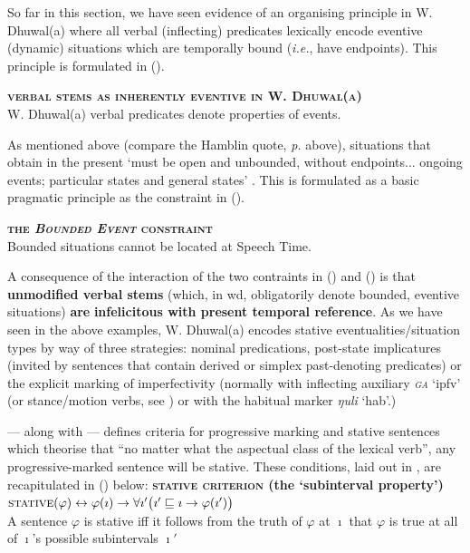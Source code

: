

So far in this section, we have seen evidence of an organising principle in W. Dhuwal(a) where all verbal (inflecting) predicates lexically encode eventive (dynamic) situations which are temporally bound (\textit{i.e.}, have endpoints). This principle is formulated in (\nextx).



\ex \textbf{\textsc{verbal stems as inherently eventive in W. Dhuwal(a)}}\\
W. Dhuwal(a) verbal predicates denote properties of events.
\xe


\noindent As mentioned above (compare the Hamblin quote, \textit{p.} \pageref{sec:djr-prs} above), situations that obtain in the present `must be open and unbounded, without endpoints... ongoing events; particular states and general states' \citet[230]{Smith2008}. This is formulated as a basic pragmatic principle as the constraint in (\nextx).

\ex  \textsc{\textbf{the \textit{Bounded Event} constraint}}\\
Bounded situations cannot be located at Speech Time.\hfill\citep{Smith2008}
\xe


\noindent A consequence of the interaction of the two contraints in () and () is that\textbf{ unmodified verbal stems} (which, in \gls{wd}, obligatorily denote bounded, eventive situations) \textbf{are} \textbf{infelicitous with present temporal reference}. As we have seen in the above examples, W. Dhuwal(a) encodes stative eventualities/situation types by way of three strategies:
\pex[nopreamble]\a nominal predications,
\a post-state implicatures (invited by sentences that contain derived or simplex past-denoting predicates) or 
\a the explicit marking of imperfectivity (normally with inflecting auxiliary \textit{\textsc{ga}} `\gls{ipfv}' (or stance/motion verbs, see \citealp[369]{Wilkinson1991}) or with the habitual marker \textit{ŋuli} `\gls{hab}'.)\xe

\citet{Dowty1979,Dowty1986} --- along with \citet{Taylor1977} --- defines criteria for progressive marking and stative sentences which theorise that ``no matter what the aspectual class of the lexical verb'', any progressive-marked sentence will be stative. These conditions, laid out in \citet[42-4]{Dowty1986}, are recapitulated in () below:
\pex\a {}\textbf{\textsc{stative criterion} (the `subinterval property')}\\
$ \textsc{stative}(\varphi) \leftrightarrow \varphi(\imath)\to\forall \imath'\big(\imath'\sqsubseteq \imath\to\varphi(\imath')\big)$\\
A sentence $ \varphi $ is stative iff it follows from the truth of $ \varphi $ at $ \imath $ that $ \varphi $ is true at all of $ \imath $'s possible subintervals $ \imath' $

